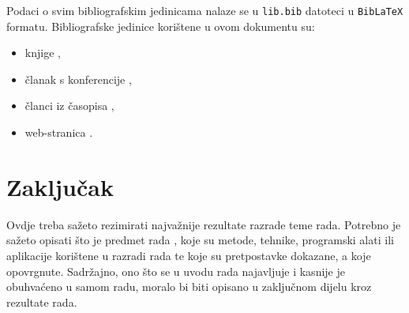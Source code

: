 \documentclass[]{foi} %
\begin{document}
Podaci o svim bibliografskim jedinicama nalaze se u \lstinline+lib.bib+ datoteci u \lstinline+BibLaTeX+ formatu. Bibliografske jedinice korištene u ovom dokumentu su:
\begin{itemize}
	\item knjige \cite{Russell2010AImodern,wooldridge2009IntroductionMultiAgentSystems,oraictolic2011AkademskoPismoStrategije},
	\item članak s konferencije \cite{okresaduric2019ModellingFormingTemporary},
	\item članci iz časopisa \cite{SchattenEtAl2016roadmap,rincon2017InfluencingPeopleSocial},
	\item web-stranica \cite{copeland2020ArtificialIntelligence}.
\end{itemize}



\chapter{Zaključak}

Ovdje treba sažeto rezimirati najvažnije rezultate razrade teme rada. Potrebno je sažeto opisati što je predmet rada \cite{copeland2020ArtificialIntelligence}, koje su metode, tehnike, programski alati ili aplikacije korištene u razradi rada te koje su pretpostavke dokazane, a koje opovrgnute. Sadržajno, ono što se u uvodu rada najavljuje i kasnije je obuhvaćeno u samom radu, moralo bi biti opisano u zaključnom dijelu kroz rezultate rada.

\lipsum[1-2]

\makebackmatter

\appendices %
\end{document}
